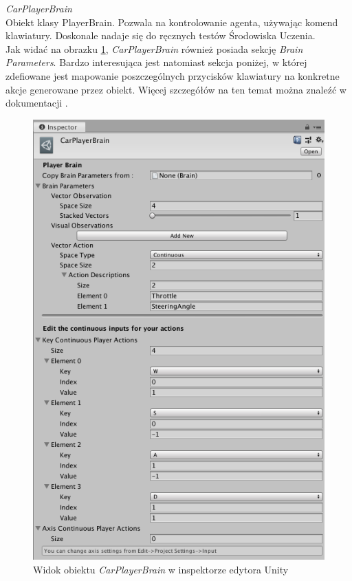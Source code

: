 \begin{enumerate*}
\item \textit{CarPlayerBrain} \\
Obiekt klasy PlayerBrain. Pozwala na kontrolowanie agenta, używając komend klawiatury. Doskonale nadaje się do ręcznych testów Środowiska Uczenia. \\
Jak widać na obrazku \ref{CarPlayerBrainView}, \textit{CarPlayerBrain} również posiada sekcję \textit{Brain Parameters}. Bardzo interesująca jest natomiast sekcja poniżej, w której zdefiowane jest mapowanie poszczególnych przycisków klawiatury na konkretne akcje generowane przez obiekt. Więcej szczegółów na ten temat można znaleźć w dokumentacji \cite{unity:playerBrainDescription}.

\vspace{0.5cm}
\begin{figure}[H]
\centering
\includegraphics[width=13cm]{resources/figures/carPlayerBrain.png}
\caption{Widok obiektu \textit{CarPlayerBrain} w inspektorze edytora Unity}
\label{CarPlayerBrainView}
\end{figure}
\end{enumerate*}

